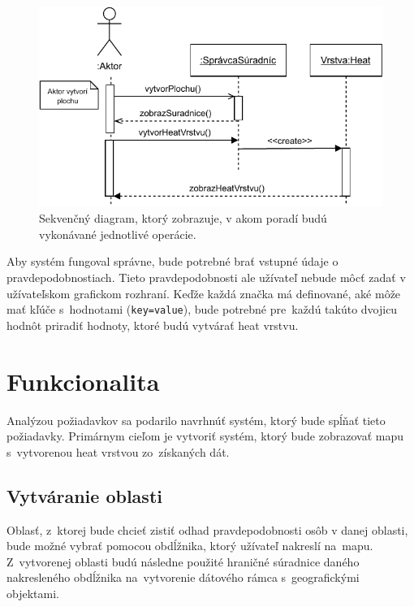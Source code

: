 \begin{figure}[h]
    \centering
    \includegraphics[width=0.9\linewidth]{obrazky-figures/seq-diagram.pdf}
    \caption{Sekvenčný diagram, ktorý zobrazuje, v akom poradí budú vykonávané jednotlivé operácie.}
    \label{fig:navrh-diagram}
\end{figure}

Aby systém fungoval správne, bude potrebné brať vstupné údaje o pravdepodobnostiach. Tieto pravdepodobnosti ale užívateľ nebude môcť zadať v užívateľskom grafickom rozhraní. Keďže každá značka má definované, aké môže mať kľúče s~hodnotami (\texttt{key=value}), bude potrebné pre~každú takúto dvojicu hodnôt priradiť hodnoty, ktoré budú vytvárať heat vrstvu. 


\section{Funkcionalita}
Analýzou požiadavkov sa podarilo navrhnúť systém, ktorý bude spĺňať tieto požiadavky. Primárnym cieľom je vytvoriť systém, ktorý bude zobrazovať mapu s~vytvorenou heat vrstvou zo~získaných dát.

\subsection*{Vytváranie oblasti}
Oblasť, z~ktorej bude chcieť zistiť odhad pravdepodobnosti osôb v danej oblasti, bude možné vybrať pomocou obdĺžnika, ktorý užívateľ nakreslí na~mapu. Z~vytvorenej oblasti budú následne použité hraničné súradnice daného nakresleného obdĺžnika na~vytvorenie dátového rámca s~geografickými objektami. 

